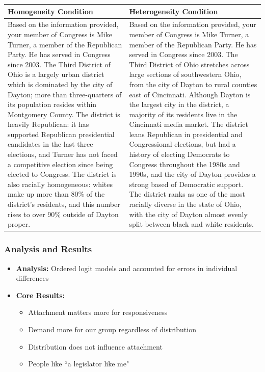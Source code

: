 \documentclass[14pt]{beamer}
\newcommand\tb{\textbf}
\begin{document}
\begin{frame}
\scriptsize
\begin{table}
	\centering
	\begin{tabulary}{\linewidth}{p{5.5cm}p{5.5cm}}
	\\
	\hline
	\tb{Homogeneity Condition}&\tb{Heterogeneity Condition} \\
	\hline
	Based on the information provided, your member of Congress is Mike Turner, a member of the Republican Party. He has served in Congress since 2003. The Third District of Ohio is a largely urban district which is dominated by the city of Dayton; more than three-quarters of its population resides within Montgomery County. The district is heavily Republican: it has supported Republican presidential candidates in the last three elections, and Turner has not faced a competitive election since being elected to Congress. The district is also racially homogeneous: whites make up more than 80\% of the district’s residents, and this number rises to over 90\% outside of Dayton proper.&Based on the information provided, your member of Congress is Mike Turner, a member of the Republican Party. He has served in Congress since 2003. The Third District of Ohio stretches across large sections of southwestern Ohio, from the city of Dayton to rural counties east of Cincinnati. Although Dayton is the largest city in the district, a majority of its residents live in the Cincinnati media market. The district leans Republican in presidential and Congressional elections, but had a history of electing Democrats to Congress throughout the 1980s and 1990s, and the city of Dayton provides a strong based of Democratic support. The district ranks as one of the most racially diverse in the state of Ohio, with the city of Dayton almost evenly split between black and white residents.\\
	\hline
	\end{tabulary}
\end{table}
\end{frame}

\begin{frame}
\frametitle{Analysis and Results}

\begin{itemize} 
	\item \tb{Analysis:} Ordered logit models and accounted for errors in individual differences
	\item \tb{Core Results:}
	\begin{itemize}
		\item Attachment matters more for responsiveness
		\item Demand more for our group regardless of distribution
		\item Distribution does not influence attachment
		\item People like ``a legislator like me"
	\end{itemize}
\end{itemize}
\end{frame}
\end{document}

